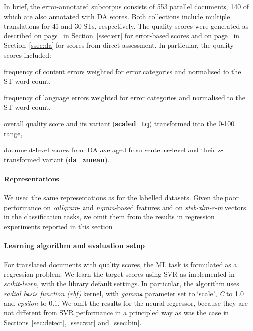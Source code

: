 In brief, the error-annotated subcorpus consists of 553 parallel documents, 140 of which are also annotated with DA scores. Both collections include multiple translations for 46 and 30 STs, respectively.
The quality scores were generated as described on page~\pageref{pg:tq} in Section~\ref{ssec:err} for error-based scores and on page~\pageref{pg:final_da} in Section~\ref{ssec:da} for scores from direct assessment. 
In particular, the quality scores included:
\begin{description}\compresslist{}
	\item[accuracy:] frequency of content errors weighted for error categories and normalised to the ST word count,
	\item[fluency:] frequency of language errors weighted for error categories and normalised to the ST word count,
	\item[tq:] overall quality score and its variant (\textbf{scaled\_tq}) transformed into the 0-100 range,
	\item[da\_mean:] document-level scores from DA averaged from sentence-level and their z-transformed variant (\textbf{da\_zmean}).
\end{description}

\paragraph{Representations}

We used the same representations as for the labelled datasets. 
Given the poor performance on \textit{collgram}- and \textit{ngram}-based features and on \textit{stsb-xlm-r-m} vectors in the classification tasks, we omit them from the results in regression experiments reported in this section. 

\paragraph{Learning algorithm and evaluation setup}
For translated documents with quality scores, the ML task is formulated as a regression problem. We learn the target scores using \gls{SVR} as implemented in \textit{scikit-learn}, with the library default settings. In particular, the algorithm uses \textit{radial basis function (rbf)} kernel, with \textit{gamma} parameter set to `scale', \textit{C} to 1.0 and \textit{epsilon} to 0.1.
We omit the results for the neural regressor, because they are not different from SVR performance in a principled way as was the case in Sections~\ref{sec:detect}, \ref{ssec:var} and~\ref{ssec:bin}.

